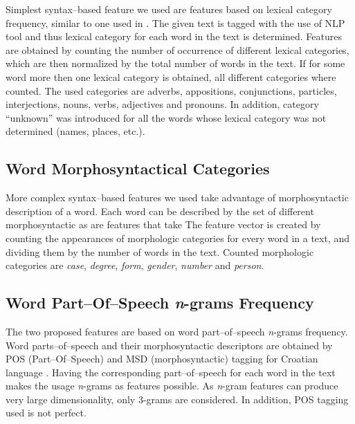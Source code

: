 \documentclass{llncs}
\begin{document}
Simplest syntax--based feature we used are features based on lexical category
frequency, similar to one used in \cite{kukushkina2001using}. The given text is
tagged with the use of NLP tool and thus lexical category for each word in the text is determined. Features are obtained by
counting the number of occurrence of different lexical categories, which are
then normalized by the total number of words in the text. If for some word more
then one lexical category is obtained, all different categories where counted. 
The used categories are adverbs, appositions, conjunctions, particles,
interjections, nouns, verbs, adjectives and pronouns. In addition, category
``unknown'' was introduced for all the words whose lexical category was not
determined (names, places, etc.).

\subsection{Word Morphosyntactical Categories}
\label{sec:morphosyntactic}

More complex syntax--based features we used take advantage of morphosyntactic
description of a word. Each word can be described by the set of different
morphosyntactic as are features that take The feature vector is created by
counting the appearances of morphologic categories for every word in a text, and dividing them by the number of words in
the text. Counted morphologic categories are \emph{case}, \emph{degree},
\emph{form}, \emph{gender}, \emph{number} and \emph{person}.

\subsection{Word Part--Of--Speech \emph{n}-grams Frequency}
\label{sec:ngrami-tipova}
The two proposed features are based on word part--of--speech \emph{n}-grams
frequency. Word parts--of--speech and their morphosyntactic descriptors are obtained by POS
(Part--Of--Speech) and MSD (morphosyntactic) tagging for Croatian language
\cite{snajder08automatic}. Having the corresponding part--of--speech for
each word in the text makes the usage \emph{n}-grams as features
possible. As \emph{n}-gram features can produce very large dimensionality, 
only 3-grams are considered. In addition, POS tagging used is not perfect. 
\end{document}

